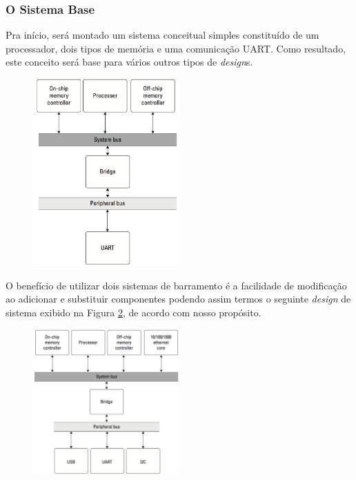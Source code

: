 \subsubsection{O Sistema Base}



Pra início, será montado um sistema conceitual simples constituído de um processador, dois tipos de memória e uma comunicação UART. Como resultado, este conceito será base para vários outros tipos de \textit{design}s.



\begin{figure}[H] \centering

	\includegraphics[width=0.5\textwidth]{img/f3-9.png}

	\caption{}

	\label{fig:f3-9}

\end{figure}



O benefício de utilizar dois sistemas de barramento é a facilidade de modificação ao adicionar e substituir componentes podendo assim termos o seguinte \textit{design} de sistema exibido na Figura \ref{fig:f3-10}, de acordo com nosso propósito.



\begin{figure}[H] \centering

	\includegraphics[width=0.5\textwidth]{img/f3-10.png}

	\caption{}

	\label{fig:f3-10}

\end{figure}




